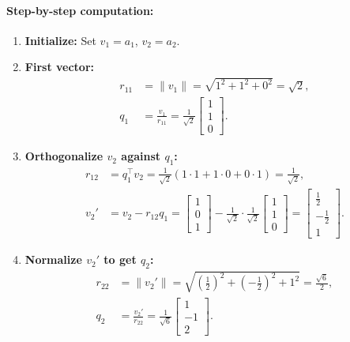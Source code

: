 \documentclass[../../main.tex]{subfiles}
\begin{document}
\paragraph{Step-by-step computation:}
\begin{enumerate}
    \item \textbf{Initialize:} Set $v_1 = a_1$, $v_2 = a_2$.
    \item \textbf{First vector:}
          \begin{align*}
              r_{11} & = \|v_1\| = \sqrt{1^2 + 1^2 + 0^2} = \sqrt{2},                                       \\
              q_1    & = \frac{v_1}{r_{11}} = \frac{1}{\sqrt{2}} \begin{bmatrix} 1 \\ 1 \\ 0 \end{bmatrix}.
          \end{align*}
    \item \textbf{Orthogonalize $v_2$ against $q_1$:}
          \begin{align*}
              r_{12} & = q_1^\top v_2 = \frac{1}{\sqrt{2}} (1 \cdot 1 + 1 \cdot 0 + 0 \cdot 1) = \frac{1}{\sqrt{2}},                                                                                                                            \\
              v_2'   & = v_2 - r_{12} q_1 = \begin{bmatrix} 1 \\ 0 \\ 1 \end{bmatrix} - \frac{1}{\sqrt{2}} \cdot \frac{1}{\sqrt{2}} \begin{bmatrix} 1 \\ 1 \\ 0 \end{bmatrix} = \begin{bmatrix} \frac{1}{2} \\ -\frac{1}{2} \\ 1 \end{bmatrix}.
          \end{align*}
    \item \textbf{Normalize $v_2'$ to get $q_2$:}
          \begin{align*}
              r_{22} & = \|v_2'\| = \sqrt{\left(\frac{1}{2}\right)^2 + \left(-\frac{1}{2}\right)^2 + 1^2} = \frac{\sqrt{6}}{2}, \\
              q_2    & = \frac{v_2'}{r_{22}} = \frac{1}{\sqrt{6}} \begin{bmatrix} 1 \\ -1 \\ 2 \end{bmatrix}.
          \end{align*}
\end{enumerate}
\end{document}

